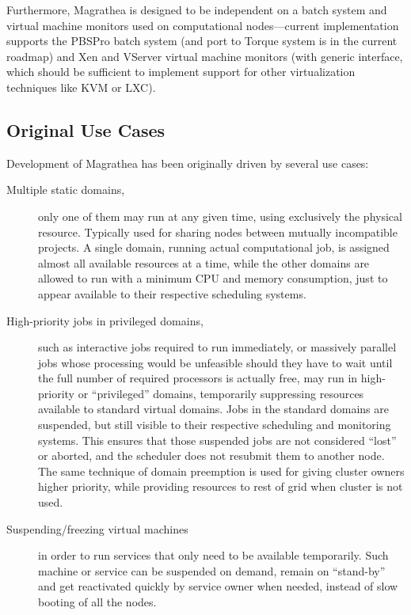 \documentclass[a4paper]{article}
\begin{document}
Furthermore, Magrathea is designed to be independent on
a batch system and virtual machine monitors used on computational
nodes---current implementation supports  the PBSPro batch system (and port to Torque system is in the 
current roadmap) and Xen and VServer virtual machine monitors (with generic interface, which should 
be sufficient to implement support for other virtualization techniques like KVM or LXC).

\subsection{Original Use Cases}
Development of Magrathea has been originally driven by several use cases:

\begin{description}
\item[Multiple static domains,] only one of them may run at any given time, using 
exclusively the physical resource.
Typically used for sharing nodes between mutually
incompatible projects. A single domain, running actual computational job, is assigned almost 
all available resources at a time, while the other domains are allowed to run with 
a minimum CPU and memory consumption,
just to appear available to their respective scheduling systems.

\item[High-priority jobs in privileged domains,]
such as interactive jobs required to run immediately, or massively parallel 
jobs whose processing would
be unfeasible should they have to wait until the full number of required processors is
actually free, may run in high-priority or ``privileged'' domains,
temporarily suppressing resources available to standard virtual domains. Jobs
in the standard domains are suspended, but still visible to
their respective scheduling and monitoring systems. This ensures that those
suspended jobs are not considered ``lost'' or aborted, and the
scheduler does not resubmit them to another node. The same technique of domain preemption
is used for giving cluster owners higher priority, while providing resources to rest 
of grid when cluster is not used.
\item [Suspending/freezing virtual machines] in order to run
services that only need to be available temporarily. Such machine or service can be 
suspended on demand, remain on ``stand-by'' and get reactivated quickly by service owner
when needed, instead of slow booting of all the nodes.
\end{description}
\end{document}
